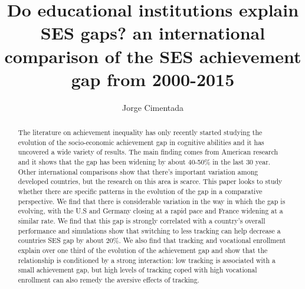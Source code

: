 \documentclass[11pt, a4paper]{article}\usepackage[]{graphicx}\usepackage[]{color}
\title{Do educational institutions explain SES gaps? an international comparison of the SES achievement gap from 2000-2015}
\author{Jorge Cimentada}
\begin{document}
\setlength{\parindent}{2em}
\setlength{\parskip}{1em}

\maketitle





\begin{abstract}
The literature on achievement inequality has only recently started studying the evolution of the socio-economic achievement gap in cognitive abilities and it has uncovered a wide variety of results. The main finding comes from American research and it shows that the gap has been widening by about 40-50\% in the last 30 year. Other international comparisons show that there's important variation among developed countries, but the research on this area is scarce. This paper looks to study whether there are specific patterns in the evolution of the gap in a comparative perspective. We find that there is considerable variation in the way in which the gap is evolving, with the U.S and Germany closing at a rapid pace and France widening at a similar rate. We find that this gap is strongly correlated with a country's overall performance and simulations show that switching to less tracking can help decrease a countries SES gap by about 20\%. We also find that tracking and vocational enrollment explain over one third of the evolution of the achievement gap and show that the relationship is conditioned by a strong interaction: low tracking is associated with a small achievement gap, but high levels of tracking coped with high vocational enrollment can also remedy the aversive effects of tracking.
\end{abstract}












\end{document}
